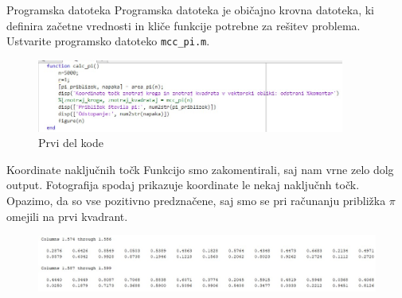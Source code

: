 \documentclass{beamer}
\begin{document}
\begin{frame}{Programska datoteka}
Programska datoteka je običajno krovna datoteka, ki definira začetne vrednosti
in kliče funkcije potrebne za rešitev problema. Ustvarite programsko datoteko
\texttt{mcc\_pi.m}.
   \begin{figure}
    \centering
    \includegraphics[width=0.9\textwidth]{calc_pi.m.jpg}
    \caption{Prvi del kode}
  \end{figure}
\end{frame}

\begin{frame}{Koordinate naključnih točk}
Funkcijo smo zakomentirali, saj nam vrne zelo dolg output. Fotografija spodaj prikazuje koordinate le nekaj naključnh točk. Opazimo, da so vse pozitivno predznačene, saj smo se pri računanju približka $\pi$ omejili na prvi kvadrant.
\begin{figure}
\includegraphics[width=\linewidth]{koordinate točk.jpg}
\end{figure}
\end{frame}
\end{document}
